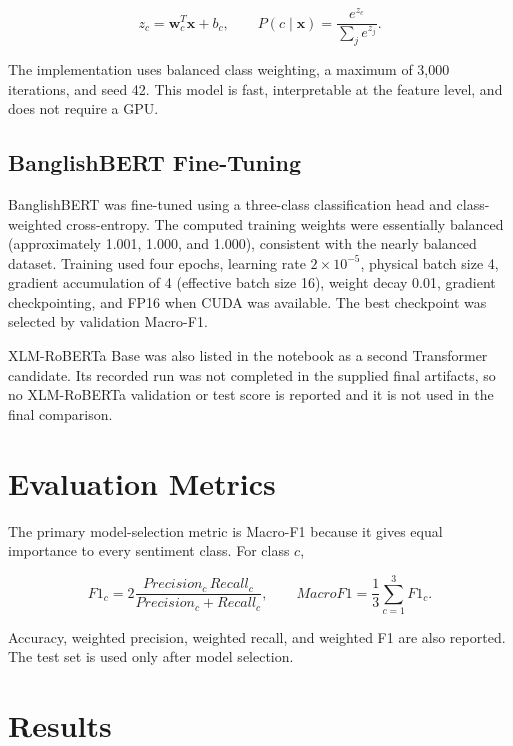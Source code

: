 \documentclass[12pt,a4paper]{report}
\begin{document}
\begin{equation}
z_c=\mathbf{w}_c^T\mathbf{x}+b_c,\qquad
P(c\mid\mathbf{x})=\frac{e^{z_c}}{\sum_j e^{z_j}}.
\end{equation}

The implementation uses balanced class weighting, a maximum of 3,000
iterations, and seed 42. This model is fast, interpretable at the feature
level, and does not require a GPU.

\subsection{BanglishBERT Fine-Tuning}
BanglishBERT was fine-tuned using a three-class classification head and
class-weighted cross-entropy. The computed training weights were essentially
balanced (approximately 1.001, 1.000, and 1.000), consistent with the nearly
balanced dataset. Training used four epochs, learning rate
$2\times10^{-5}$, physical batch size 4, gradient accumulation of 4
(effective batch size 16), weight decay 0.01, gradient checkpointing, and
FP16 when CUDA was available. The best checkpoint was selected by validation
Macro-F1.

XLM-RoBERTa Base \cite{xlmr} was also listed in the notebook as a second
Transformer candidate. Its recorded run was not completed in the supplied
final artifacts, so no XLM-RoBERTa validation or test score is reported and
it is not used in the final comparison.

\section{Evaluation Metrics}
The primary model-selection metric is Macro-F1 because it gives equal
importance to every sentiment class. For class $c$,

\begin{equation}
F1_c =
2\frac{Precision_c\,Recall_c}{Precision_c+Recall_c},
\qquad
MacroF1=\frac{1}{3}\sum_{c=1}^{3}F1_c.
\end{equation}

Accuracy, weighted precision, weighted recall, and weighted F1 are also
reported. The test set is used only after model selection.

\section{Results}
\end{document}
